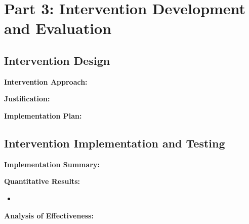 \documentclass[11pt]{article}
\begin{document}

\section{Part 3: Intervention Development and Evaluation}

\subsection{Intervention Design}

\textbf{Intervention Approach:}


\textbf{Justification:}


\textbf{Implementation Plan:}


\subsection{Intervention Implementation and Testing}

\textbf{Implementation Summary:}


\textbf{Quantitative Results:}
\begin{itemize}
    \item %
\end{itemize}


\textbf{Analysis of Effectiveness:}

\end{document}
